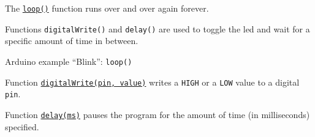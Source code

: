 \begin{frame}
    \par The \href{https://www.arduino.cc/reference/en/language/structure/sketch/loop/}{\texttt{loop()}} function runs over and over again forever.
    \par Functions \texttt{digitalWrite()} and \texttt{delay()} are used to toggle the \acs{led} and wait for a specific amount of time in between.
    \begin{listing}[H]
        \caption{Arduino\textregistered{} example ``Blink'': \texttt{loop()}}
        \label{lst:arduino:blinky:loop}
    \end{listing}
    \vspace{-1em}
    \par Function \href{https://www.arduino.cc/reference/en/language/functions/digital-io/digitalwrite/}{\texttt{digitalWrite(pin, value)}} writes a \texttt{HIGH} or a \texttt{LOW} value to a digital \texttt{pin}.
    \par Function \href{https://www.arduino.cc/reference/en/language/functions/time/delay/}{\texttt{delay(ms)}} pauses the program for the amount of time (in milliseconds) specified.
\end{frame}